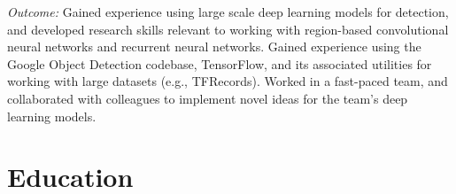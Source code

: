 \documentclass[10pt,letterpaper]{article}
\begin{document}
\begin{itemize}
	{\it Outcome:} Gained experience using large scale deep learning models for detection, and developed research skills relevant to working with region-based convolutional neural networks and recurrent neural networks. Gained experience using the Google Object Detection codebase, TensorFlow, and its associated utilities for working with large datasets (e.g., TFRecords). Worked in a fast-paced team, and collaborated with colleagues to implement novel ideas for the team's deep learning models.

\end{itemize}

\vspace{-1.8em}
\section{Education}
\vspace{-0.5em}
\end{document}
